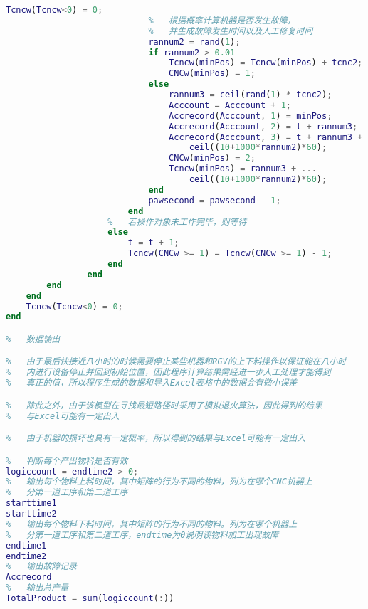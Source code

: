 \documentclass[no-math,withoutpreface,bwprint]{cumcmthesis} %
\numberwithin{equation}{section}
\numberwithin{figure}{section}
\numberwithin{table}{section}
\begin{document}
\begin{lstlisting}[language=matlab]
                            Tcncw(Tcncw<0) = 0;
                            %   根据概率计算机器是否发生故障，
                            %   并生成故障发生时间以及人工修复时间
                            rannum2 = rand(1);
                            if rannum2 > 0.01
                                Tcncw(minPos) = Tcncw(minPos) + tcnc2;
                                CNCw(minPos) = 1;
                            else
                                rannum3 = ceil(rand(1) * tcnc2);
                                Acccount = Acccount + 1;
                                Accrecord(Acccount, 1) = minPos;
                                Accrecord(Acccount, 2) = t + rannum3;
                                Accrecord(Acccount, 3) = t + rannum3 + ...
                                    ceil((10+1000*rannum2)*60);
                                CNCw(minPos) = 2;
                                Tcncw(minPos) = rannum3 + ...
                                    ceil((10+1000*rannum2)*60);
                            end
                            pawsecond = pawsecond - 1;
                        end
                    %   若操作对象未工作完毕，则等待
                    else
                        t = t + 1;
                        Tcncw(CNCw >= 1) = Tcncw(CNCw >= 1) - 1;
                    end
                end
        end
    end
    Tcncw(Tcncw<0) = 0;
end

%   数据输出

%   由于最后快接近八小时的时候需要停止某些机器和RGV的上下料操作以保证能在八小时
%   内进行设备停止并回到初始位置，因此程序计算结果需经进一步人工处理才能得到
%   真正的值，所以程序生成的数据和导入Excel表格中的数据会有微小误差

%   除此之外，由于该模型在寻找最短路径时采用了模拟退火算法，因此得到的结果
%   与Excel可能有一定出入

%   由于机器的损坏也具有一定概率，所以得到的结果与Excel可能有一定出入

%   判断每个产出物料是否有效
logiccount = endtime2 > 0;
%   输出每个物料上料时间，其中矩阵的行为不同的物料，列为在哪个CNC机器上
%   分第一道工序和第二道工序
starttime1
starttime2
%   输出每个物料下料时间，其中矩阵的行为不同的物料。列为在哪个机器上
%   分第一道工序和第二道工序，endtime为0说明该物料加工出现故障
endtime1
endtime2
%   输出故障记录
Accrecord
%   输出总产量
TotalProduct = sum(logiccount(:))
\end{lstlisting}
\end{document}
